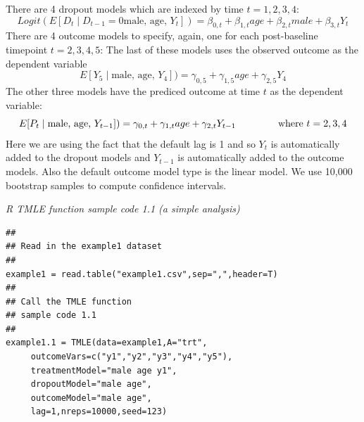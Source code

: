 \documentclass[10pt]{article}
\renewcommand{\baselinestretch}{1.3}
\begin{document}
There are 4 dropout models which are indexed by time $t = 1, 2, 3, 4$:
$$ Logit( E[ D_{t} \mid D_{t-1}=0 \mbox{male, age, } Y_t ] ) =  \beta_{0,t} + \beta_{1,t} age + \beta_{2,t} male + \beta_{3,t} Y_t $$
There are 4 outcome models to specify, again, one for each post-baseline timepoint $t = 2, 3, 4, 5$:  The last of these models uses the observed outcome as the dependent variable
\[ E[ Y_5 \mid  \mbox{male, age, } Y_4 ] ) =  \gamma_{0,5} + \gamma_{1,5} age + \gamma_{2,5} Y_4 \]
The other three models have the prediced outcome at time $t$ as the dependent variable:
\[ E[ P_{t} \mid  \mbox{male, age, } Y_{t-1} ] ) =  \gamma_{0,t} + \gamma_{1,t} age + \gamma_{2,t} Y_{t-1} \mbox{\ \hspace{0.5in} where } t=2,3,4 \]
Here we are using the fact that the default lag is 1 and so $Y_t$ is automatically added to the dropout models and $Y_{t-1}$ is automatically added to the outcome models.  Also the default outcome model type is the linear model.
We use 10,000 bootstrap samples to compute confidence intervals.

\begin{minipage}{\textwidth}
\renewcommand{\baselinestretch}{1.0}\selectfont%
\begin{minipage}[l]{5.6in}
\normalsize\em%
R TMLE function sample code 1.1 (a simple analysis) 
\end{minipage}\vspace{-0.08in}
\begin{Verbatim}[baselinestretch=1.0, fontsize=\small, frame=single, commandchars=\\\{\}]
## 
## Read in the example1 dataset
##
example1 = read.table("example1.csv",sep=",",header=T)
##
## Call the TMLE function
## sample code 1.1
##
example1.1 = TMLE(data=example1,A="trt",
     outcomeVars=c("y1","y2","y3","y4","y5"),
     treatmentModel="male age y1",
     dropoutModel="male age",
     outcomeModel="male age",
     lag=1,nreps=10000,seed=123)
\end{Verbatim}
\end{minipage}
\vspace{0.2in}
\end{document}
